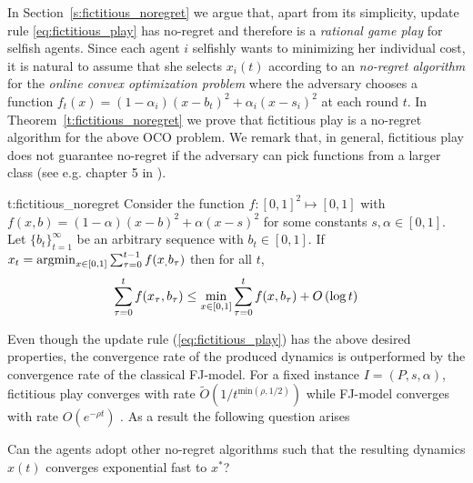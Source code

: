 In Section~\ref{s:fictitious_noregret} we argue that,
apart from its simplicity, update rule \ref{eq:fictitious_play} has
no-regret and therefore is a \emph{rational game play} for selfish agents.
Since each agent $i$ selfishly wants to minimizing her individual cost,
it is natural to assume that she selects $x_i(t)$ according to
an \emph{no-regret algorithm} for the \emph{online convex optimization problem}
where the adversary chooses a function $f_t(x)=(1-\alpha_i)(x-b_t)^2 + \alpha_i(x-s_i)^2$
at each round $t$. In Theorem~\ref{t:fictitious_noregret}
we prove that fictitious play is a no-regret algorithm
for the above OCO problem. We remark that, in general,
fictitious play does not guarantee no-regret if the adversary can pick
functions from a larger class (see e.g. chapter 5 in \cite{Haz16}).

\begin{reptheorem}{t:fictitious_noregret}
  Consider the function $f:[0,1]^2 \mapsto [0,1]$ with
  $f(x,b) = (1-\alpha)(x-b)^2 + \alpha(x-s)^2$ for some
  constants $s,\alpha \in [0,1]$.
  Let $\{b_t\}_{t=1}^\infty$ be an arbitrary sequence with
  $b_t \in [0,1]$. If $x_t = \operatorname*{argmin}_{x \in [0,1]}\sum_{\tau=0}^{t-1}f(x_,b_\tau)$
  then for all $t$,
  \[
    \sum_{\tau=0}^{t}f(x_\tau,b_\tau) \leq
    \min_{x \in [0,1]}\sum_{\tau=0}^tf(x,b_\tau) + O\left(\log t\right)
  \]
\end{reptheorem}

Even though the update rule (\ref{eq:fictitious_play}) has the above
desired properties, the convergence rate of the produced dynamics is
outperformed by the convergence rate of the classical FJ-model. For
a fixed instance $I=(P,s,\alpha)$, fictitious play converges with rate
$\widetilde{O}(1/t^{\text{min}(\rho,1/2)})$ while FJ-model
converges with rate $O(e^{-\rho t})$ \cite{GS14}.
As a result the following question arises
\begin{question}
  Can the agents adopt other no-regret algorithms such that the resulting
  dynamics $x(t)$ converges exponential fast to $x^*$?
\end{question}


